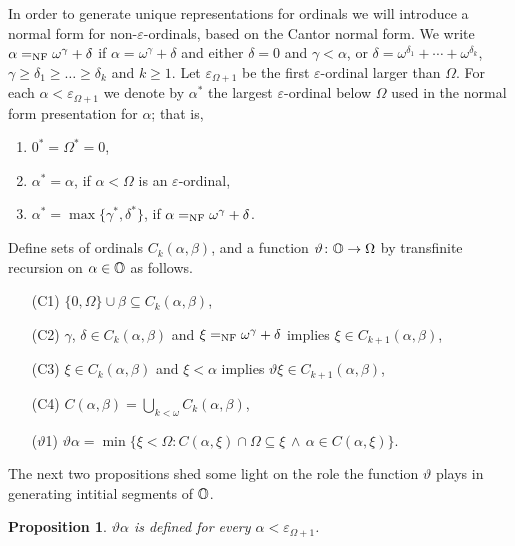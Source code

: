 \documentclass[UKenglish,cleveref,DIV=12]{scrartcl}
\newtheorem{proposition}[lemma]{Proposition}
\theoremstyle{definition}
\theoremstyle{definition}
\begin{document}
In order to generate unique representations for ordinals we will introduce a
normal form for non-$\varepsilon$-ordinals, based on the Cantor normal form.
We write $\alpha=_{\mathrm{NF}}\omega^\gamma+\delta$ if $\alpha=\omega^\gamma+\delta$ and either $\delta=0$ and
$\gamma<\alpha$, or $\delta=\omega^{\delta_1}+\cdots+\omega^{\delta_k}$,
$\gamma\ge\delta_1\ge\ldots\ge\delta_k$ and $k\ge1$. Let $\varepsilon_{\Omega+1}$
be the first $\varepsilon$-ordinal larger than $\Omega$. For each
$\alpha<\varepsilon_{\Omega+1}$ we denote by $\alpha^*$ the largest $\varepsilon$-ordinal
below $\Omega$ used in the normal form presentation for $\alpha$; that
is,
\begin{enumerate}
 \item $0^*=\Omega^*=0$,
 \item $\alpha^*=\alpha$, if $\alpha<\Omega$ is an $\varepsilon$-ordinal,
 \item $\alpha^*=\max\{\gamma^*,\delta^*\}$, if $\alpha=_{\mathrm{NF}}\omega^\gamma+\delta$.
\end{enumerate}
Define sets of ordinals $C_k(\alpha,\beta)$, and a function $\vartheta\colon\mathbb{O}\to\Omega$ by transfinite recursion on $\alpha\in\mathbb{O}$ as follows.
\begin{itemize}
 \item [(C1)] $\{0,\Omega\}\cup\beta\subseteq C_k(\alpha,\beta)$,
 \item [(C2)] $\gamma$, $\delta\in C_k(\alpha,\beta)$ and $\xi=_{\mathrm{NF}}\omega^\gamma+\delta$ implies $\xi\in C_{k+1}(\alpha,\beta)$,
 \item [(C3)] $\xi\in C_k(\alpha,\beta)$ and $\xi<\alpha$ implies $\vartheta\xi\in C_{k+1}(\alpha,\beta)$,
 \item [(C4)] $C(\alpha,\beta)=\bigcup_{k<\omega} C_k(\alpha,\beta)$,
 \item [($\vartheta$1)] $\vartheta\alpha=\min\{\xi<\Omega: C(\alpha,\xi)\cap\Omega\subseteq\xi\,\land\,\alpha\in C(\alpha,\xi)\}$.
\end{itemize}
The next two propositions shed some light on the role the function
$\vartheta$ plays in generating intitial segments of $\mathbb{O}$.
\begin{proposition}\label{extprop:theta1}
 $\vartheta\alpha$ is defined for every $\alpha<\varepsilon_{\Omega+1}$.
\end{proposition}
\end{document}
